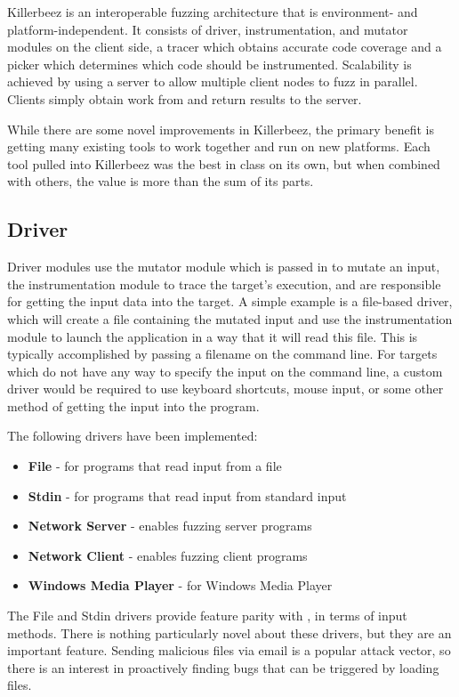 Killerbeez is an interoperable fuzzing architecture that is
environment- and platform-independent. It consists of driver, instrumentation,
and mutator modules on the client side, a tracer which obtains accurate code
coverage and a picker which determines which code should be instrumented.
Scalability is achieved by using a \BOINC{} server to allow multiple client
nodes to fuzz in parallel.  Clients simply obtain work from and return results
to the server.

While there are some novel improvements in Killerbeez,
the primary benefit is getting many existing tools to work
together and run on new platforms.  Each tool pulled into Killerbeez was the best in class on its own, but
when combined with others, the value is more than the sum of its parts.

\subsection{Driver} \label{Driver}
Driver modules use the mutator module which is passed in to mutate an input,
the instrumentation module to trace the target's execution, and are responsible
for getting the input data into the target.  A simple example is a
file-based driver, which will create a file containing the mutated input and
use the instrumentation module to launch the application in a way that it will
read this file.  This is typically accomplished by passing a filename on the
command line.  For targets which do not have any way to specify the input
on the command line, a custom driver would be required to use keyboard
shortcuts, mouse input, or some other method of getting the input into the
program.

The following drivers have been implemented:
\begin{itemize}[noitemsep]
\item \textbf{File} - for programs that read input from a file
\item \textbf{Stdin} - for programs that read input from standard input
\item \textbf{Network Server} - enables fuzzing server programs
\item \textbf{Network Client} - enables fuzzing client programs
\item \textbf{Windows Media Player} - for Windows Media Player
\end{itemize}

The File and Stdin drivers provide feature parity with \AFL{}, in terms of input
methods. There is nothing particularly novel about these drivers, but they are
an important feature.  Sending malicious files via email is a popular attack
vector, so there is an interest in proactively finding bugs that can be triggered by loading files.

